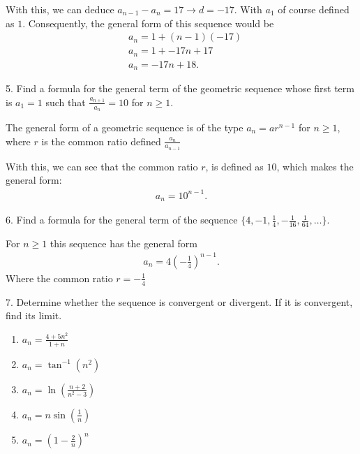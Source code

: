 \documentclass{report}
\begin{document}
    \bigbreak \noindent 
    With this, we can deduce $a_{n-1} - a_{n} =17 \rightarrow d = -17$. With $a_{1}$ of course defined as $1$. Consequently, the general form of this sequence would be
    \begin{align*}
        &a_{n} = 1 + (n-1)(-17) \\
        &a_{n} = 1 + -17n +17 \\
        &a_{n} = -17n + 18
    .\end{align*}

    \bigbreak \noindent 
    \begin{mdframed}
        5. Find a formula for the general term of the geometric sequence whose first term is \( a_1 = 1 \) such that \(\frac{a_{n+1}}{a_n} = 10\) for \( n \geq 1 \).
    \end{mdframed}
    \bigbreak \noindent 
    \begin{remark}
       The general form of a geometric sequence is of the type $a_{n}= ar^{n-1}$ for $n \geq 1$, where $r$ is the common ratio defined $\frac{a_{n}}{a_{n-1}}$ 
    \end{remark}
    \bigbreak \noindent 
    With this, we can see that the common ratio $r$, is defined as $10$, which makes the general form:
    \begin{align*}
        a_{n} = 10^{n-1}
    .\end{align*}

    \bigbreak \noindent 
    \begin{mdframed}
        6. Find a formula for the general term of the sequence \( \{4, -1, \frac{1}{4}, -\frac{1}{16}, \frac{1}{64}, \ldots\} \).
    \end{mdframed}
    \bigbreak \noindent 
    For $n \geq 1$ this sequence has the general form
    \begin{align*}
        a_{n} = 4\left(-\frac{1}{4}\right)^{n-1}
    .\end{align*}
    \bigbreak \noindent 
    Where the common ratio $r = -\frac{1}{4}$

    \pagebreak \bigbreak \noindent 
    \begin{mdframed}
        7. Determine whether the sequence is convergent or divergent. If it is convergent, find its limit.
        \begin{enumerate}[label=(\alph*)]
            \item $a_{n} = \frac{4+5n^{2}}{1+n} $
            \item $a_{n} = \tan^{-1}{(n^{2})} $
            \item $a_{n} = \ln{\left(\frac{n+2}{n^{2}-3}\right)} $
            \item $a_{n} = n\sin{\left(\frac{1}{n}\right)} $
            \item $a_{n} = \left(1-\frac{2}{n}\right)^{n}$
        \end{enumerate}

    \end{mdframed}


    
    



    
    
\end{document}
